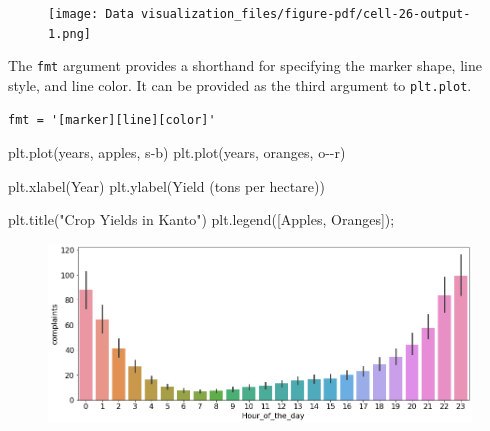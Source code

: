 \documentclass[
  letterpaper,
  DIV=11,
  numbers=noendperiod]{scrreprt}
\newenvironment{Shaded}{\begin{snugshade}}{\end{snugshade}}
\newcommand{\NormalTok}[1]{\textcolor[rgb]{0.00,0.23,0.31}{#1}}
\newcommand{\OperatorTok}[1]{\textcolor[rgb]{0.37,0.37,0.37}{#1}}
\newcommand{\StringTok}[1]{\textcolor[rgb]{0.13,0.47,0.30}{#1}}
\begin{document}
\begin{figure}[H]

{\centering \texttt{[image: Data visualization\_files/figure-pdf/cell-26-output-1.png]}

}

\end{figure}

The \texttt{fmt} argument provides a shorthand for specifying the marker
shape, line style, and line color. It can be provided as the third
argument to \texttt{plt.plot}.

\begin{verbatim}
fmt = '[marker][line][color]'
\end{verbatim}

\begin{Shaded}
\begin{Highlighting}[]
\NormalTok{plt.plot(years, apples, }\StringTok{\textquotesingle{}s{-}b\textquotesingle{}}\NormalTok{)}
\NormalTok{plt.plot(years, oranges, }\StringTok{\textquotesingle{}o{-}{-}r\textquotesingle{}}\NormalTok{)}

\NormalTok{plt.xlabel(}\StringTok{\textquotesingle{}Year\textquotesingle{}}\NormalTok{)}
\NormalTok{plt.ylabel(}\StringTok{\textquotesingle{}Yield (tons per hectare)\textquotesingle{}}\NormalTok{)}

\NormalTok{plt.title(}\StringTok{"Crop Yields in Kanto"}\NormalTok{)}
\NormalTok{plt.legend([}\StringTok{\textquotesingle{}Apples\textquotesingle{}}\NormalTok{, }\StringTok{\textquotesingle{}Oranges\textquotesingle{}}\NormalTok{])}\OperatorTok{;}
\end{Highlighting}
\end{Shaded}

\begin{figure}[H]

{\centering \includegraphics{Data visualization_files/figure-pdf/cell-27-output-1.png}

}

\end{figure}
\end{document}
